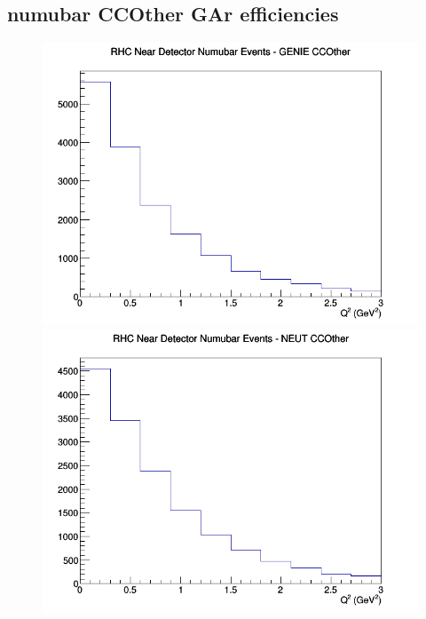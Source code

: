 \documentclass[12pt]{article}
\begin{document}
\subsection{numubar CCOther GAr efficiencies}
\begin{figure}[h]
\includegraphics[width=\linewidth]{eff_Q2/GAr/CCOther_RHC_ND_numubar_Q2_GENIE.png}
\endminipage
{}
\includegraphics[width=\linewidth]{eff_Q2/GAr/CCOther_RHC_ND_numubar_Q2_NEUT.png}
\endminipage
{}

\end{figure}
\end{document}
